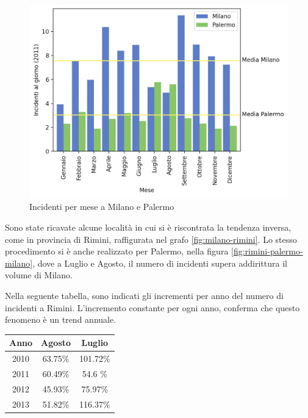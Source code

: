 \documentclass[a4paper]{report}
\begin{document}
\begin{figure}
    \includegraphics[width=\linewidth]{../src/incidenti/incidenti_senza_coords/mese_incidenti/palermo_milano.png}
    \caption{Incidenti per mese a Milano e Palermo}
    \label{fig:palermo-milano}
\end{figure}

Sono state ricavate alcune località in cui si è riscontrata la tendenza inversa, come in provincia 
di Rimini, raffigurata nel grafo \ref{fig:milano-rimini}.
Lo stesso procedimento si è anche realizzato per Palermo, nella figura \ref{fig:rimini-palermo-milano}, 
dove a Luglio e Agosto, il numero di incidenti supera addirittura il volume di Milano.

Nella seguente tabella, sono indicati gli incrementi per anno del numero di incidenti a Rimini.
L'incremento constante per ogni anno, conferma che questo fenomeno è un trend annuale.

\begin{center}
    \def\arraystretch{1.5}%
    \begin{tabular}{ |c|c|c| } 
    \hline
    Anno & Agosto & Luglio \\ 
    \hline
    \rowcolor{TableGray}
    2010 & 63.75\% & 101.72\% \\ 
    2011 & 60.49\% & 54.6 \%  \\
    \rowcolor{TableGray}
    2012 & 45.93\% & 75.97\%  \\
    2013 & 51.82\% & 116.37\% \\
    \hline
    \end{tabular}
\end{center}
\end{document}
